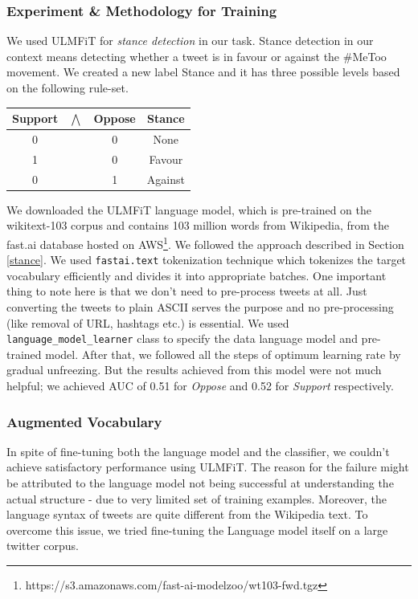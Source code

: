 \subsubsection{Experiment \& Methodology for Training}


We used ULMFiT for \emph{stance detection} in our task. 
Stance detection in our context means detecting whether a tweet is in favour or against the \#MeToo movement. 
We created a new label Stance and it has three possible levels based on the following rule-set. 
\begin{center}
\begin{tabular}{ c c c | c }
	\hline
Support	&$\bigwedge$&Oppose & Stance \\
	\hline
0&~	& 0  & None \\
1&~	& 0  & Favour  \\
0&~ & 1 & Against \\
\end{tabular}
\end{center}

We downloaded the ULMFiT language model, which is pre-trained on the wikitext-103 corpus and contains 103 million words from Wikipedia, from the fast.ai database hosted on AWS\footnote{https://s3.amazonaws.com/fast-ai-modelzoo/wt103-fwd.tgz}. %
We followed the approach described in Section \ref{stance}.
We used \verb|fastai.text| tokenization technique which tokenizes  the target vocabulary efficiently and divides it into appropriate batches. One important thing to note here is that we don't need to pre-process tweets at all. Just converting the tweets to plain ASCII serves the purpose and no pre-processing (like removal of URL, hashtags etc.) is essential. 
We used \verb|language_model_learner| class to specify the data language model and pre-trained model. After that, we followed all the steps of optimum learning rate by gradual unfreezing. But the results achieved from this model were not much helpful;  we achieved AUC of 0.51 for \textit{Oppose} and 0.52 for \textit{Support} respectively. 

\subsubsection{Augmented Vocabulary} In spite of fine-tuning both the language model and the classifier, we couldn't achieve satisfactory performance using ULMFiT. The reason for the failure might be attributed to the language model not being successful at understanding the actual structure - due to very limited set of training examples. Moreover, the language syntax of tweets are quite different from the Wikipedia text. To overcome this issue, we tried fine-tuning the Language model itself on a large twitter corpus. 

